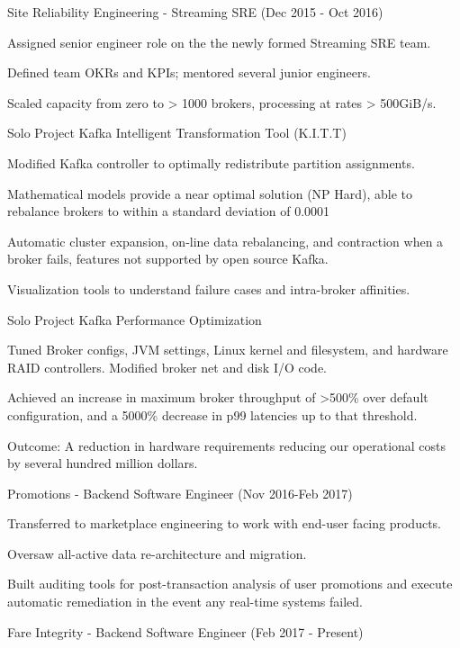 \documentclass[10pt,letterpaper]{article}
\begin{document}
{\begin{itemize*}
\end{itemize*}
\item Site Reliability Engineering - Streaming SRE (Dec 2015 - Oct 2016)
\begin{itemize*}
  \item Assigned senior engineer role on the the newly formed Streaming SRE team. 
  \item Defined team OKRs and KPIs; mentored several junior engineers.
  \item Scaled capacity from zero to > 1000 brokers, processing at rates > 500GiB/s.
  \item [Solo Project] Kafka Intelligent Transformation Tool (K.I.T.T) 
    \item Modified Kafka controller to optimally redistribute partition assignments.
    \item Mathematical models provide a near optimal solution (NP Hard), able to rebalance brokers to within a standard deviation of 0.0001%
    \item Automatic cluster expansion, on-line data rebalancing, and contraction when a broker fails, features not supported by open source Kafka.
    \item Visualization tools to understand failure cases and intra-broker affinities.
  \item [Solo Project] Kafka Performance Optimization
    \item Tuned Broker configs, JVM settings, Linux kernel and filesystem, and hardware RAID controllers. Modified broker net and disk I/O code.
    \item Achieved an increase in maximum broker throughput of >500\% over default configuration, and a 5000\% decrease in p99 latencies up to that threshold.
    \item Outcome: A reduction in hardware requirements reducing our operational costs by several hundred million dollars.
\end{itemize*}
\item Promotions - Backend Software Engineer (Nov 2016-Feb 2017)
    \item Transferred to marketplace engineering to work with end-user facing products. 
    \item Oversaw all-active data re-architecture and migration.
    \item Built auditing tools for post-transaction analysis of user promotions and execute automatic remediation in the event any real-time systems failed.
\item Fare Integrity - Backend Software Engineer (Feb 2017 - Present)
}
\end{document}
